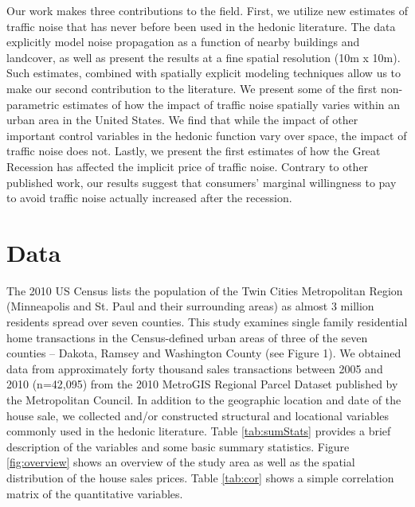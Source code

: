 \documentclass{article}\usepackage{graphicx, color}
\begin{document}
Our work makes three contributions to the field. First, we utilize new estimates of traffic noise that has never before been used in the hedonic literature. The data explicitly model noise propagation as a function of nearby buildings and landcover, as well as present the results at a fine spatial resolution (10m x 10m). Such estimates, combined with spatially explicit modeling techniques allow us to make our second contribution to the literature. We present some of the first non-parametric estimates of how the impact of traffic noise spatially varies within an urban area in the United States. We find that while the impact of other important control variables in the hedonic function vary over space, the impact of traffic noise does not. Lastly, we present the first estimates of how the Great Recession has affected the implicit price of traffic noise. Contrary to other published work, our results suggest that consumers' marginal willingness to pay to avoid traffic noise actually increased after the recession.

\section{Data}
The 2010 US Census lists the population of the Twin Cities Metropolitan Region (Minneapolis and St. Paul and their surrounding areas) as almost 3 million residents spread over seven counties. This study examines single family residential home transactions in the Census-defined urban areas of three of the seven counties – Dakota, Ramsey and Washington County (see Figure 1). We obtained data from approximately forty thousand sales transactions between 2005 and 2010 (n=42,095) from the 2010 MetroGIS Regional Parcel Dataset published by the Metropolitan Council. In addition to the geographic location and date of the house sale, we collected and/or constructed structural and locational variables commonly used in the hedonic literature. Table \ref{tab:sumStats} provides a brief description of the variables and some basic summary statistics. Figure \ref{fig:overview} shows an overview of the study area as well as the spatial distribution of the house sales prices. Table \ref{tab:cor} shows a simple correlation matrix of the quantitative variables.
\end{document}
